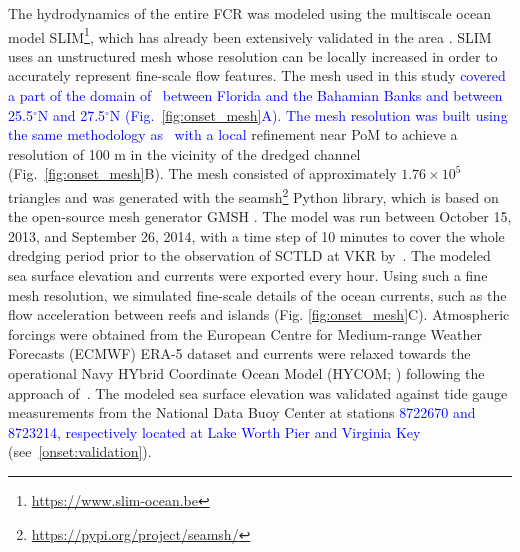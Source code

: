 \documentclass[preprint,12pt,authoryear]{elsarticle}
\newcommand{\modif}[1]{\textcolor{blue}{#1}}
\begin{document}
The hydrodynamics of the entire FCR was modeled using the multiscale ocean model SLIM\footnote{\url{ https://www.slim-ocean.be}}, which has already been extensively validated in the area \citep{frys2020fine,dobbelaere2020coupled,dobbelaere2022impacts,dobbelaere2022connecting}. SLIM uses an unstructured mesh whose resolution can be locally increased in order to accurately represent fine-scale flow features. The mesh used in this study \modif{covered a part of the domain of~\cite{dobbelaere2020coupled} between Florida and the Bahamian Banks and between 25.5$^\circ$N and 27.5$^\circ$N (Fig.~\ref{fig:onset_mesh}A). The mesh resolution was built using the same methodology as~\citep{dobbelaere2020coupled} with a local} refinement near PoM to achieve a resolution of 100 m in the vicinity of the dredged channel (Fig.~\ref{fig:onset_mesh}B). The mesh consisted of approximately $1.76\times 10^5$ triangles and was generated with the seamsh\footnote{\url{https://pypi.org/project/seamsh/}} Python library, which is based on the open-source mesh generator GMSH \citep{geuzaine2009gmsh}. The model was run between October 15, 2013, and September 26, 2014, with a time step of 10 minutes to cover the whole dredging period prior to the observation of SCTLD at VKR by~\cite{precht2016unprecedented}. The modeled sea surface elevation and currents were exported every hour. Using such a fine mesh resolution, we simulated fine-scale details of the ocean currents, such as the flow acceleration between reefs and islands (Fig. \ref{fig:onset_mesh}C). Atmospheric forcings were obtained from the European Centre for Medium-range Weather Forecasts (ECMWF) ERA-5 dataset and currents were relaxed towards the operational Navy HYbrid Coordinate Ocean Model (HYCOM; \citealp{chassignet2007hycom}) following the approach of~\cite{dobbelaere2022impacts}. The modeled sea surface elevation was validated against tide gauge measurements from the National Data Buoy Center at stations \modif{8722670 and 8723214, respectively located at Lake Worth Pier and Virginia Key} (see~\ref{onset:validation}).
\end{document}
